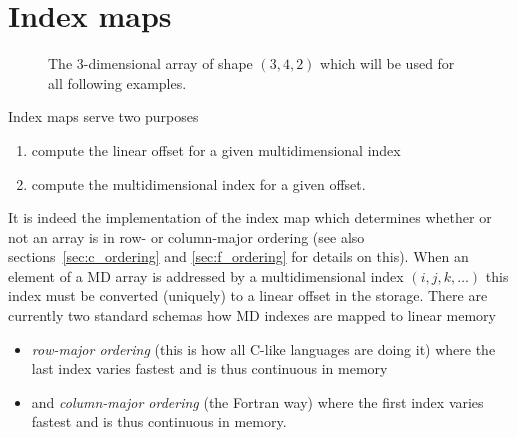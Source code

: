 \section{Index maps}

\begin{figure}[tb]
\centering
\begin{minipage}{0.3\linewidth}
\centering
{}
\end{minipage}
\hfill
\begin{minipage}{0.45\linewidth}
\caption{{\small\label{fig:array_app:array_3d}
The 3-dimensional array of shape $(3,4,2)$ which will be used for all following
examples. 
}}
\end{minipage}
\end{figure}
Index maps serve two purposes 
\begin{enumerate}
\item compute the linear offset for a given multidimensional index
\item compute the multidimensional index for a given offset.
\end{enumerate}
It is indeed the implementation of the index map which determines whether or not
an array is in row- or column-major ordering (see also
sections~\ref{sec:c_ordering} and \ref{sec:f_ordering} for details on this).
When an element of a MD array is addressed by a multidimensional index
$(i,j,k,\hdots)$ this index must be converted (uniquely) to a linear offset in
the storage. There are currently two standard schemas how MD indexes are mapped
to linear memory
\begin{itemize}
\item {\em row-major ordering} (this is how all C-like languages are doing it) where
the last index varies fastest and is thus continuous in memory
\item and {\em column-major ordering} (the Fortran way) where the first index
varies fastest and is thus continuous in memory.
\end{itemize}

